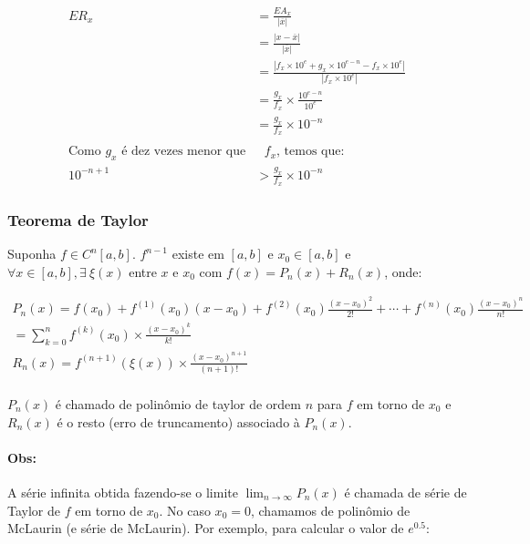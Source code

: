 \documentclass{article}
\begin{document}
            \begin{align*}
                {ER}_x &= \frac{{EA}_x}{|\overline{x}|}\\
                &= \frac{|x - \overline{x}|}{|\overline{x}|}\\
                &= \frac{|f_x \times 10^e + g_x \times 10^{e-n} - f_x \times 10^e|}{|f_x \times 10^e|}\\
                &= \frac{g_x}{f_x} \times \frac{10^{e-n}}{10^e}\\
                &= \frac{g_x}{f_x} \times 10^{-n}\\
                \\
                \text{Como $g_x$ é dez vezes menor que}& \text{ $f_x$, temos que:}\\
                10^{-n + 1} &> \frac{g_x}{f_x} \times 10^{-n}
            \end{align*}


        \subsubsection{Teorema de Taylor}

            Suponha $f \in C^n[a,b]$. $f^{n-1}$ existe em $[a,b]$ e $x_0 \in [a,b]$ e $\forall x \in [a,b], \exists~\xi(x)$ entre $x$ e $x_0$ com
            $f(x) = P_n(x) + R_n(x)$, onde:

            \begin{gather*}
                P_n(x) = f(x_0) + f^{(1)}(x_0)(x - x_0) + f^{(2)}(x_0)\frac{{(x-x_0)}^2}{2!} + \cdots + f^{(n)}(x_0)\frac{{(x-x_0)}^n}{n!}\\
                = \sum_{k=0}^{n} f^{(k)}(x_0) \times \frac{{(x - x_0)}^k}{k!}\\
                R_n(x) = f^{(n+1)}(\xi(x)) \times \frac{{(x - x_0)}^{n+1}}{(n + 1)!}\\
            \end{gather*}

            $P_n(x)$ é chamado de polinômio de taylor de ordem $n$ para $f$ em torno de $x_0$ e $R_n(x)$ é o resto (erro de truncamento) associado à $P_n(x)$.

            \paragraph{Obs:} A série infinita obtida fazendo-se o limite $\lim_{n \to \infty} P_n(x)$ é chamada de série de Taylor de $f$ em torno de $x_0$. No caso $x_0 = 0$, chamamos de polinômio de McLaurin (e série de McLaurin). Por exemplo, para calcular o valor de $e^{0.5}$:
\end{document}
